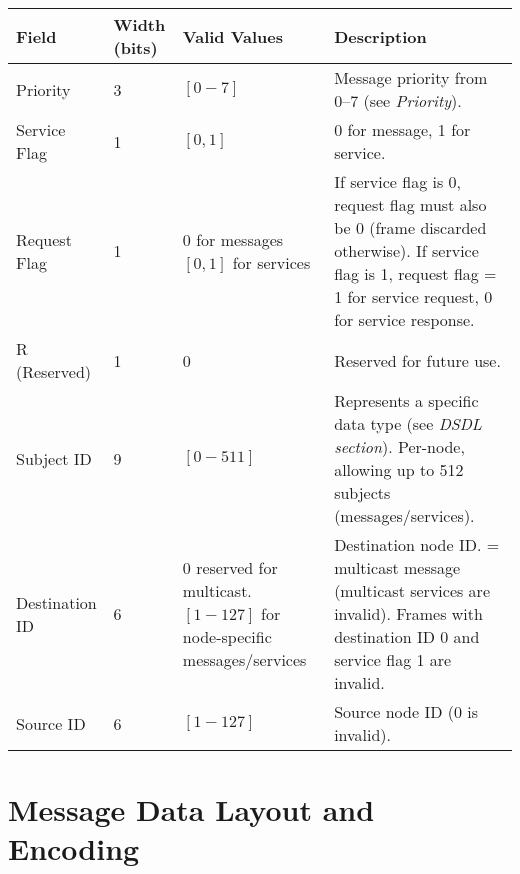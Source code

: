 \documentclass[a4paper,12pt]{article}
\begin{document}
\begin{longtable}{@{}p{3cm}p{2cm}p{5cm}p{5cm}@{}}
\toprule
\textbf{Field}       & \textbf{Width (bits)} & \textbf{Valid Values}                & \textbf{Description} \\ \midrule
Priority             & 3                     & \([0{-}7]\)                         & Message priority from 0–7 (see \textit{Priority}). \\ \midrule
Service Flag         & 1                     & \([0,1]\)                           & 0 for message, 1 for service. \\ \midrule
Request Flag         & 1                     & 0 for messages \newline \([0,1]\) for services & 
If service flag is 0, request flag must also be 0 (frame discarded otherwise). \newline
If service flag is 1, request flag = 1 for service request, 0 for service response. \\ \midrule
R (Reserved)         & 1                     & 0                                   & Reserved for future use. \\ \midrule
Subject ID           & 9                     & \([0{-}511]\)                       & Represents a specific data type (see \textit{DSDL section}). \newline Per-node, allowing up to 512 subjects (messages/services). \\ \midrule
Destination ID       & 6                     & 0 reserved for multicast. \newline \([1{-}127]\) for node-specific messages/services & 
Destination node ID. \newline
0 = multicast message (multicast services are invalid). \newline
Frames with destination ID 0 and service flag 1 are invalid. \\ \midrule
Source ID            & 6                     & \([1{-}127]\)                       & Source node ID (0 is invalid). \\ \bottomrule
\end{longtable}
\newpage
\section{Message Data Layout and Encoding}
\label{sec:msg-layout}
\end{document}
